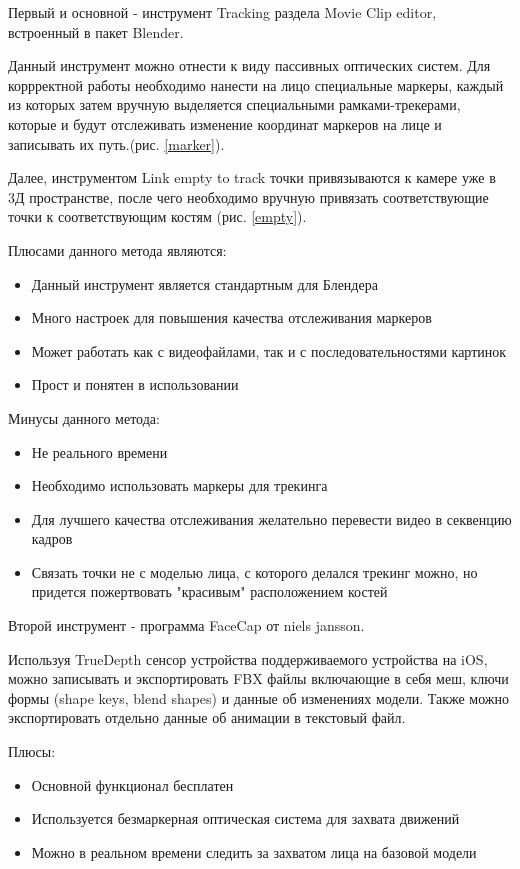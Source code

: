 Первый и основной - инструмент Tracking раздела Movie Clip editor, встроенный в пакет Blender.

Данный инструмент можно отнести к виду пассивных оптических систем. Для коррректной работы необходимо нанести на лицо специальные маркеры, каждый из которых затем вручную выделяется специальными рамками-трекерами, которые и будут отслеживать изменение координат маркеров на лице и записывать их путь.(рис. \ref{marker}).

Далее, инструментом Link empty to track точки привязываются к камере уже в 3Д пространстве, после чего необходимо вручную привязать соответствующие точки к соответствующим костям (рис. \ref{empty}).

Плюсами данного метода являются:
\begin{itemize}
	\item Данный инструмент является стандартным для Блендера
	\item Много настроек для повышения качества отслеживания маркеров
	\item Может работать как с видеофайлами, так и с последовательностями картинок
	\item Прост и понятен в использовании
\end{itemize}
Минусы данного метода:
\begin{itemize}
	\item Не реального времени
	\item Необходимо использовать маркеры для трекинга
	\item Для лучшего качества отслеживания желательно перевести видео в секвенцию кадров
	\item Связать точки не с моделью лица, с которого делался трекинг можно, но придется пожертвовать "красивым" расположением костей
\end{itemize}

Второй инструмент - программа FaceCap от niels jansson. 

Используя TrueDepth сенсор устройства поддерживаемого устройства на iOS, можно записывать и экспортировать FBX файлы включающие в себя меш, ключи формы (shape keys, blend shapes) и данные об изменениях модели. Также можно экспортировать отдельно данные об анимации в текстовый файл.

Плюсы:
\begin{itemize}
	\item Основной функционал бесплатен
	\item Используется безмаркерная оптическая система для захвата движений
	\item Можно в реальном времени следить за захватом лица на базовой модели
\end{itemize}

